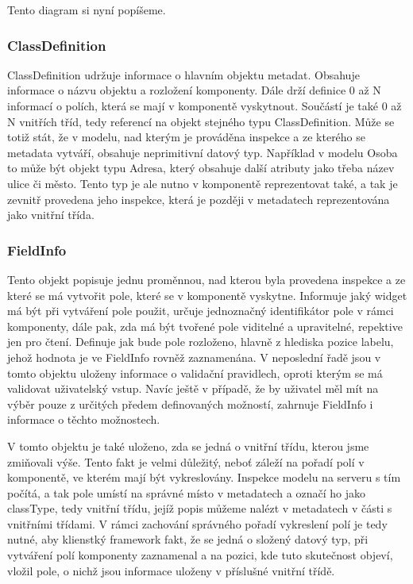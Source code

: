 Tento diagram si nyní popíšeme.
\subsubsection{ClassDefinition}
ClassDefinition udržuje informace o hlavním objektu metadat. Obsahuje informace o názvu objektu a rozložení komponenty. Dále drží definice 0 až N informací o polích, která se mají v komponentě vyskytnout. Součástí je také 0 až N vnitřích tříd, tedy referencí na objekt stejného typu ClassDefinition. Může se totiž stát, že v modelu, nad kterým je prováděna inspekce a ze kterého se metadata vytváří, obsahuje neprimitivní datový typ. Například v modelu Osoba to může být objekt typu Adresa, který obsahuje další atributy jako třeba název ulice či město. Tento typ je ale nutno v komponentě reprezentovat také, a tak je zevnitř provedena jeho inspekce, která je později v metadatech reprezentována jako vnitřní třída. 

\subsubsection{FieldInfo}
Tento objekt popisuje jednu proměnnou, nad kterou byla provedena inspekce a ze které se má vytvořit pole, které se v komponentě vyskytne. Informuje jaký widget má být při vytváření pole použit, určuje jednoznačný identifikátor pole v rámci komponenty, dále pak, zda má být tvořené pole viditelné a upravitelné, repektive jen pro čtení. Definuje jak bude pole rozloženo, hlavně z hlediska pozice labelu, jehož hodnota je ve FieldInfo rovněž zaznamenána. V neposlední řadě jsou v tomto objektu uloženy informace o validační pravidlech, oproti kterým se má validovat uživatelský vstup. Navíc ještě v případě, že by uživatel měl mít na výběr pouze z určitých předem definovaných možností, zahrnuje FieldInfo i informace o těchto možnostech. 

V tomto objektu je také uloženo, zda se jedná o vnitřní třídu, kterou jsme zmiňovali výše. Tento fakt je velmi důležitý, neboť záleží na pořadí polí v komponentě, ve kterém mají být vykreslovány. Inspekce modelu na serveru s tím počítá, a tak pole umístí na správné místo v metadatech a označí ho jako classType, tedy vnitřní třídu, jejíž popis můžeme nalézt v metadatech v části s vnitřními třídami. V rámci zachování správného pořadí vykreslení polí je tedy nutné, aby klienstký framework fakt, že se jedná o složený datový typ, při vytváření polí komponenty zaznamenal a na pozici, kde tuto skutečnost objeví, vložil pole, o nichž jsou informace uloženy v příslušné vnitřní třídě.

